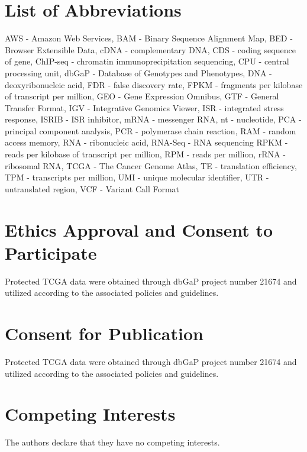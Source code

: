 \documentclass[10pt, oneside]{article}
\begin{document}
\section*{List of Abbreviations}
AWS - Amazon Web Services,
BAM - Binary Sequence Alignment Map,
BED - Browser Extensible Data,
cDNA - complementary DNA,
CDS - coding sequence of gene,
ChIP-seq - chromatin immunoprecipitation sequencing,
CPU - central processing unit,
dbGaP - Database of Genotypes and Phenotypes,
DNA - deoxyribonucleic acid,
FDR - false discovery rate,
FPKM - fragments per kilobase of transcript per million,
GEO - Gene Expression Omnibus,
GTF - General Transfer Format,
IGV - Integrative Genomics Viewer,
ISR - integrated stress response,
ISRIB - ISR inhibitor,
mRNA - messenger RNA,
nt - nucleotide,
PCA - principal component analysis,
PCR - polymerase chain reaction,
RAM - random access memory,
RNA - ribonucleic acid,
RNA-Seq - RNA sequencing
RPKM - reads per kilobase of transcript per million,
RPM - reads per million,
rRNA - ribosomal RNA,
TCGA - The Cancer Genome Atlas,
TE - translation efficiency,
TPM - transcripts per million,
UMI - unique molecular identifier,
UTR - untranslated region,
VCF - Variant Call Format\\

\section*{Ethics Approval and Consent to Participate}
Protected TCGA data were obtained through dbGaP project number 21674 and utilized according to the associated policies and guidelines.\\

\section*{Consent for Publication}
Protected TCGA data were obtained through dbGaP project number 21674 and utilized according to the associated policies and guidelines.\\

\section*{Competing Interests}
The authors declare that they have no competing interests.\\
\end{document}
